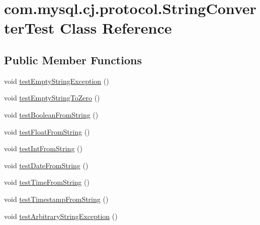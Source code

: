 \hypertarget{classcom_1_1mysql_1_1cj_1_1protocol_1_1_string_converter_test}{}\section{com.\+mysql.\+cj.\+protocol.\+String\+Converter\+Test Class Reference}
\label{classcom_1_1mysql_1_1cj_1_1protocol_1_1_string_converter_test}
\subsection*{Public Member Functions}
\begin{DoxyCompactItemize}
\item 
void \mbox{\hyperlink{classcom_1_1mysql_1_1cj_1_1protocol_1_1_string_converter_test_a387cfaa04873199a7a26516d09bc55fd}{test\+Empty\+String\+Exception}} ()
\item 
void \mbox{\hyperlink{classcom_1_1mysql_1_1cj_1_1protocol_1_1_string_converter_test_abf305a1ab3bd3df4ee3c7f0ed95c1764}{test\+Empty\+String\+To\+Zero}} ()
\item 
void \mbox{\hyperlink{classcom_1_1mysql_1_1cj_1_1protocol_1_1_string_converter_test_a9b7ec10043f4635cedfeb0f1a7a102c7}{test\+Boolean\+From\+String}} ()
\item 
void \mbox{\hyperlink{classcom_1_1mysql_1_1cj_1_1protocol_1_1_string_converter_test_aa7e0afe3a74e1dd3e1ed5321701e60be}{test\+Float\+From\+String}} ()
\item 
void \mbox{\hyperlink{classcom_1_1mysql_1_1cj_1_1protocol_1_1_string_converter_test_a9d92f1613330dd91b018666e5a36b5da}{test\+Int\+From\+String}} ()
\item 
void \mbox{\hyperlink{classcom_1_1mysql_1_1cj_1_1protocol_1_1_string_converter_test_a23661dd380e5927aab9557351af90de6}{test\+Date\+From\+String}} ()
\item 
void \mbox{\hyperlink{classcom_1_1mysql_1_1cj_1_1protocol_1_1_string_converter_test_a89bfbcb5870477be9c6212bfffa51271}{test\+Time\+From\+String}} ()
\item 
void \mbox{\hyperlink{classcom_1_1mysql_1_1cj_1_1protocol_1_1_string_converter_test_aeb3a67d004c1433654ec1e680d936169}{test\+Timestamp\+From\+String}} ()
\item 
void \mbox{\hyperlink{classcom_1_1mysql_1_1cj_1_1protocol_1_1_string_converter_test_af6f4b8b4e0215d6332d00db515f8121a}{test\+Arbitrary\+String\+Exception}} ()
\end{DoxyCompactItemize}


